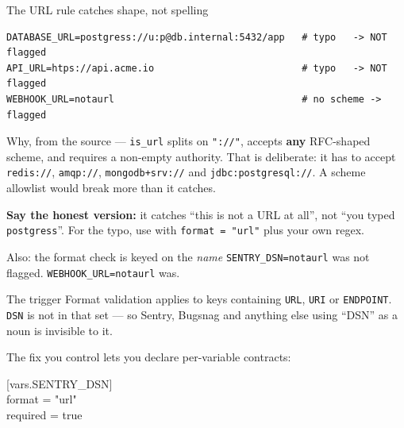 \documentclass[aspectratio=169,10pt]{beamer}
\begin{document}
\begin{frame}[fragile]{The URL rule catches shape, not spelling}
\begin{lstlisting}[style=evnxcode]
DATABASE_URL=postgress://u:p@db.internal:5432/app   # typo   -> NOT flagged
API_URL=htps://api.acme.io                          # typo   -> NOT flagged
WEBHOOK_URL=notaurl                                 # no scheme -> flagged
\end{lstlisting}

  \vspace{0.5em}
  \begin{block}{Why, from the source}
     --- \texttt{is\_url} splits on
    \texttt{"://"}, accepts \textbf{any} RFC-shaped scheme, and requires a
    non-empty authority. That is deliberate: it has to accept
    \texttt{redis://}, \texttt{amqp://}, \texttt{mongodb+srv://} and
    \texttt{jdbc:postgresql://}. A scheme allowlist would break more than it
    catches.
  \end{block}

  \vspace{0.4em}
  {\footnotesize \textbf{Say the honest version:} it catches ``this is not a
  URL at all'', not ``you typed \texttt{postgress}''. For the typo, use
   with \texttt{format = "url"} plus your own regex.}
\end{frame}

\begin{frame}{Also: the format check is keyed on the \emph{name}}
  \texttt{SENTRY\_DSN=notaurl} was not flagged. \texttt{WEBHOOK\_URL=notaurl}
  was.

  \vspace{0.8em}
  \begin{block}{The trigger}
    Format validation applies to keys containing \texttt{URL}, \texttt{URI} or
    \texttt{ENDPOINT}. \texttt{DSN} is not in that set --- so Sentry,
    Bugsnag and anything else using ``DSN'' as a noun is invisible to it.
  \end{block}

  \vspace{0.8em}
  \begin{block}{The fix you control}
     lets you declare per-variable contracts:
    \vspace{0.3em}
    \begin{center}\ttfamily\scriptsize
    {[}vars.SENTRY\_DSN{]}\\ format = "url"\\ required = true
    \end{center}
  \end{block}
\end{frame}
\end{document}
